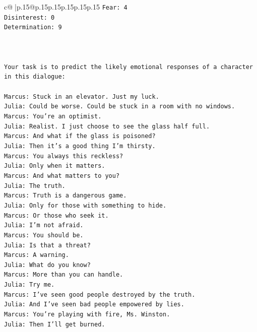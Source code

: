 \documentclass{article}
\begin{document}
{\begin{supertabular}{c@{$\;$}|p{.15\linewidth}@{}p{.15\linewidth}p{.15\linewidth}p{.15\linewidth}p{.15\linewidth}p{.15\linewidth}}
{{{\texttt{Fear: 4} \\
\texttt{Disinterest: 0} \\
\texttt{Determination: 9} \\
\\ 
\\ 
\\ 
\texttt{Your task is to predict the likely emotional responses of a character in this dialogue:} \\
\\ 
\texttt{Marcus: Stuck in an elevator. Just my luck.} \\
\texttt{Julia: Could be worse. Could be stuck in a room with no windows.} \\
\texttt{Marcus: You're an optimist.} \\
\texttt{Julia: Realist. I just choose to see the glass half full.} \\
\texttt{Marcus: And what if the glass is poisoned?} \\
\texttt{Julia: Then it's a good thing I'm thirsty.} \\
\texttt{Marcus: You always this reckless?} \\
\texttt{Julia: Only when it matters.} \\
\texttt{Marcus: And what matters to you?} \\
\texttt{Julia: The truth.} \\
\texttt{Marcus: Truth is a dangerous game.} \\
\texttt{Julia: Only for those with something to hide.} \\
\texttt{Marcus: Or those who seek it.} \\
\texttt{Julia: I'm not afraid.} \\
\texttt{Marcus: You should be.} \\
\texttt{Julia: Is that a threat?} \\
\texttt{Marcus: A warning.} \\
\texttt{Julia: What do you know?} \\
\texttt{Marcus: More than you can handle.} \\
\texttt{Julia: Try me.} \\
\texttt{Marcus: I've seen good people destroyed by the truth.} \\
\texttt{Julia: And I've seen bad people empowered by lies.} \\
\texttt{Marcus: You're playing with fire, Ms. Winston.} \\
\texttt{Julia: Then I'll get burned.} \\
}}}
\end{supertabular}}
\end{document}
